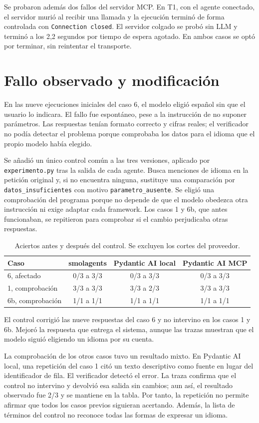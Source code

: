 Se probaron además dos fallos del servidor MCP. En T1, con el agente conectado, el servidor murió al recibir una llamada y la ejecución terminó de forma controlada con \texttt{Connection closed}. El servidor colgado se probó sin LLM y terminó a los 2,2 segundos por tiempo de espera agotado. En ambos casos se optó por terminar, sin reintentar el transporte.

\section{Fallo observado y modificación}

En las nueve ejecuciones iniciales del caso 6, el modelo eligió español sin que el usuario lo indicara. El fallo fue espontáneo, pese a la instrucción de no suponer parámetros. Las respuestas tenían formato correcto y cifras reales; el verificador no podía detectar el problema porque comprobaba los datos para el idioma que el propio modelo había elegido.

Se añadió un único control común a las tres versiones, aplicado por \texttt{experimento.py} tras la salida de cada agente. Busca menciones de idioma en la petición original y, si no encuentra ninguna, sustituye una comparación por \texttt{datos\_insuficientes} con motivo \texttt{parametro\_ausente}. Se eligió una comprobación del programa porque no depende de que el modelo obedezca otra instrucción ni exige adaptar cada framework. Los casos 1 y 6b, que antes funcionaban, se repitieron para comprobar si el cambio perjudicaba otras respuestas.

\begin{table}[htbp]
\centering\small
\caption{Aciertos antes y después del control. Se excluyen los cortes del proveedor.}
\label{tab:antes}
\begin{tabular}{lccc}
\toprule
Caso & smolagents & Pydantic AI local & Pydantic AI MCP \\
\midrule
6, afectado & 0/3 a 3/3 & 0/3 a 3/3 & 0/3 a 3/3 \\
1, comprobación & 3/3 a 3/3 & 3/3 a 2/3 & 3/3 a 3/3 \\
6b, comprobación & 1/1 a 1/1 & 1/1 a 1/1 & 1/1 a 1/1 \\
\bottomrule
\end{tabular}
\end{table}

El control corrigió las nueve respuestas del caso 6 y no intervino en los casos 1 y 6b. Mejoró la respuesta que entrega el sistema, aunque las trazas muestran que el modelo siguió eligiendo un idioma por su cuenta.

La comprobación de los otros casos tuvo un resultado mixto. En Pydantic AI local, una repetición del caso 1 citó un texto descriptivo como fuente en lugar del identificador de fila. El verificador detectó el error. La traza confirma que el control no intervino y devolvió esa salida sin cambios; aun así, el resultado observado fue 2/3 y se mantiene en la tabla. Por tanto, la repetición no permite afirmar que todos los casos previos siguieran acertando. Además, la lista de términos del control no reconoce todas las formas de expresar un idioma.
